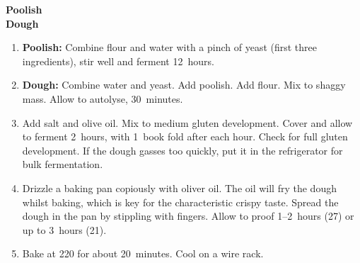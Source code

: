 
\begin{ingredients}
  \textbf{Poolish}\\
  \textbf{Dough}\\
\end{ingredients}


\begin{recipe}
  \begin{enumerate}

  \item \textbf{Poolish:} Combine flour and water with a pinch of
    yeast (first three ingredients), stir well and ferment 12~hours.
    
  \item \textbf{Dough:} Combine water and yeast.  Add poolish.  Add
    flour.  Mix to shaggy mass.  Allow to autolyse, 30~minutes.
    
  \item Add salt and olive oil.  Mix to medium gluten development.
    Cover and allow to ferment 2\fracH~hours, with 1~book fold after
    each hour.  Check for full gluten development.  If the dough
    gasses too quickly, put it in the refrigerator for bulk fermentation.
    
  \item Drizzle a baking pan copiously with oliver oil.  The oil will
    fry the dough whilst baking, which is key for the characteristic
    crispy taste.  Spread the dough in the pan by stippling with
    fingers.  Allow to proof 1\fracH--2~hours (27\degreeC) or up to
    3~hours (21\degreeC).
    
  \item Bake at 220\degreeC{} for about 20~minutes.  Cool on a wire rack.

  \end{enumerate}
\end{recipe}

